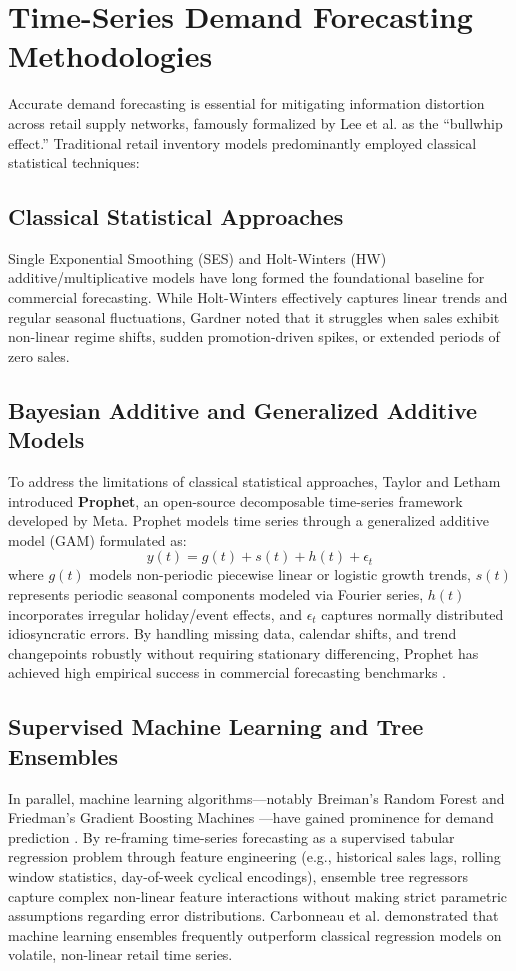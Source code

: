\section{Time-Series Demand Forecasting Methodologies}
Accurate demand forecasting is essential for mitigating information distortion across retail supply networks, famously formalized by Lee et al. \cite{8} as the ``bullwhip effect.'' Traditional retail inventory models predominantly employed classical statistical techniques:

\subsection{Classical Statistical Approaches}
Single Exponential Smoothing (SES) and Holt-Winters (HW) additive/multiplicative models \cite{5, 15, 16} have long formed the foundational baseline for commercial forecasting. While Holt-Winters effectively captures linear trends and regular seasonal fluctuations, Gardner \cite{5} noted that it struggles when sales exhibit non-linear regime shifts, sudden promotion-driven spikes, or extended periods of zero sales.

\subsection{Bayesian Additive and Generalized Additive Models}
To address the limitations of classical statistical approaches, Taylor and Letham \cite{2} introduced \textbf{Prophet}, an open-source decomposable time-series framework developed by Meta. Prophet models time series through a generalized additive model (GAM) formulated as:
\begin{equation}
y(t) = g(t) + s(t) + h(t) + \epsilon_t
\end{equation}
where $g(t)$ models non-periodic piecewise linear or logistic growth trends, $s(t)$ represents periodic seasonal components modeled via Fourier series, $h(t)$ incorporates irregular holiday/event effects, and $\epsilon_t$ captures normally distributed idiosyncratic errors. By handling missing data, calendar shifts, and trend changepoints robustly without requiring stationary differencing, Prophet has achieved high empirical success in commercial forecasting benchmarks \cite{9}.

\subsection{Supervised Machine Learning and Tree Ensembles}
In parallel, machine learning algorithms---notably Breiman's Random Forest \cite{12} and Friedman's Gradient Boosting Machines \cite{13}---have gained prominence for demand prediction \cite{11}. By re-framing time-series forecasting as a supervised tabular regression problem through feature engineering (e.g., historical sales lags, rolling window statistics, day-of-week cyclical encodings), ensemble tree regressors capture complex non-linear feature interactions without making strict parametric assumptions regarding error distributions. Carbonneau et al. \cite{11} demonstrated that machine learning ensembles frequently outperform classical regression models on volatile, non-linear retail time series.

